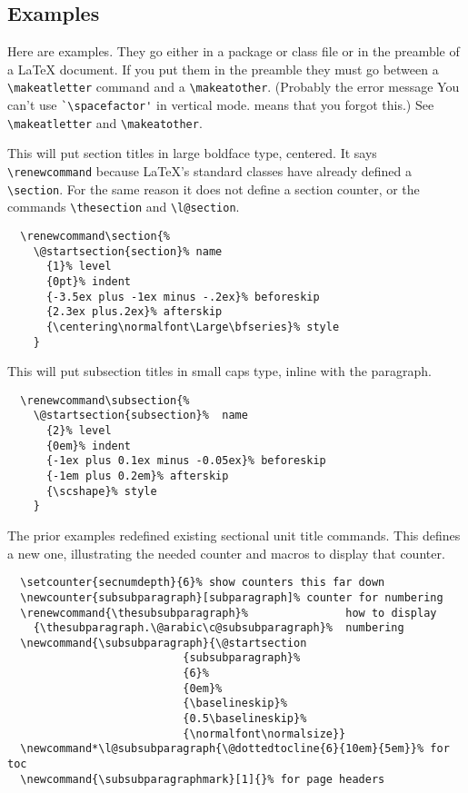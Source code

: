 \subsection{Examples}

Here are examples. They go either in a package or class file or in the preamble
of a LaTeX document. If you put them in the preamble they must go between a
\verb|\makeatletter| command and a \verb|\makeatother|. (Probably the error message You can't
use \verb|`\spacefactor'| in vertical mode. means that you forgot this.) See
\verb|\makeatletter| and \verb|\makeatother|.

This will put section titles in large boldface type, centered. It says
\verb|\renewcommand| because LaTeX’s standard classes have already defined a \verb|\section|.
For the same reason it does not define a section counter, or the commands
\verb|\thesection| and \verb|\l@section|.

\begin{verbatim}
  \renewcommand\section{%
    \@startsection{section}% name
      {1}% level
      {0pt}% indent
      {-3.5ex plus -1ex minus -.2ex}% beforeskip
      {2.3ex plus.2ex}% afterskip
      {\centering\normalfont\Large\bfseries}% style
    }
\end{verbatim}

This will put subsection titles in small caps type, inline with the paragraph.

\begin{verbatim}
  \renewcommand\subsection{%
    \@startsection{subsection}%  name
      {2}% level
      {0em}% indent
      {-1ex plus 0.1ex minus -0.05ex}% beforeskip
      {-1em plus 0.2em}% afterskip
      {\scshape}% style
    }
\end{verbatim}

The prior examples redefined existing sectional unit title commands. This
defines a new one, illustrating the needed counter and macros to display that
counter.

\begin{verbatim}
  \setcounter{secnumdepth}{6}% show counters this far down
  \newcounter{subsubparagraph}[subparagraph]% counter for numbering
  \renewcommand{\thesubsubparagraph}%               how to display 
    {\thesubparagraph.\@arabic\c@subsubparagraph}%  numbering
  \newcommand{\subsubparagraph}{\@startsection
                           {subsubparagraph}%
                           {6}%
                           {0em}%
                           {\baselineskip}%
                           {0.5\baselineskip}%
                           {\normalfont\normalsize}}
  \newcommand*\l@subsubparagraph{\@dottedtocline{6}{10em}{5em}}% for toc
  \newcommand{\subsubparagraphmark}[1]{}% for page headers
\end{verbatim}

 
